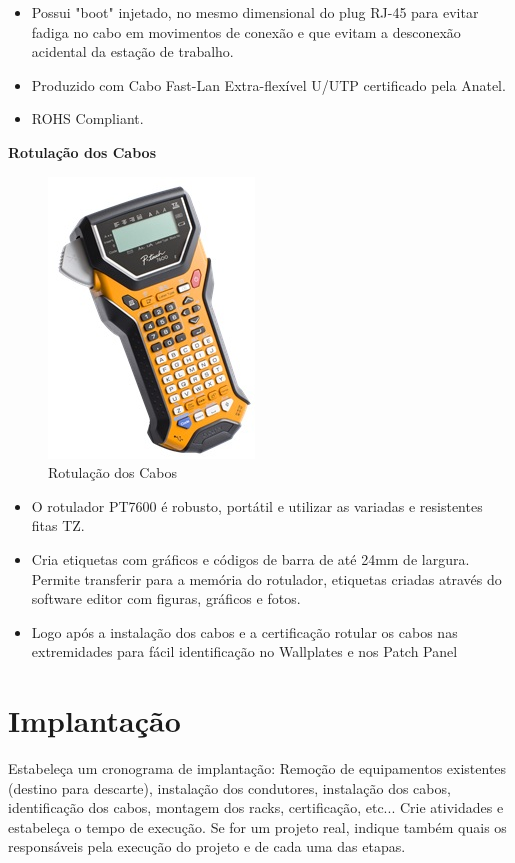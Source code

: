 \documentclass[	DIV=calc,%
							paper=a4,%
							fontsize=12pt,%
							onecolumn]{scrartcl}	 					%
\begin{document}
\begin{itemize}
	\item Possui "boot" injetado, no mesmo dimensional do plug RJ-45 para evitar fadiga no cabo em movimentos de conexão e que evitam a desconexão acidental da estação de trabalho. 
	\item Produzido com Cabo Fast-Lan Extra-flexível U/UTP certificado pela Anatel.
	\item ROHS Compliant.
\end{itemize}

\textbf{Rotulação dos Cabos}

\begin{figure}[!h]
	\centering
	\caption{Rotulação dos Cabos}
	\includegraphics{rotulador_1}
\end{figure}

\begin{itemize}
	\item O rotulador PT7600 é robusto, portátil e utilizar as variadas e resistentes fitas TZ.
	\item Cria etiquetas com gráficos e códigos de barra de até 24mm de largura. Permite transferir para a memória do rotulador, etiquetas criadas através do software editor com figuras, gráficos e fotos.
	\item Logo após a instalação dos cabos e a certificação rotular os cabos nas extremidades para fácil identificação no Wallplates e nos Patch Panel
\end{itemize}

\section{Implantação}
Estabeleça um cronograma de implantação:
Remoção de equipamentos existentes (destino para descarte), instalação dos condutores, instalação dos cabos, 
identificação dos cabos, montagem dos racks, certificação, etc... Crie atividades e estabeleça o tempo de execução. Se for um projeto real, indique também quais os responsáveis pela execução do projeto e de cada uma das etapas.
\end{document}
